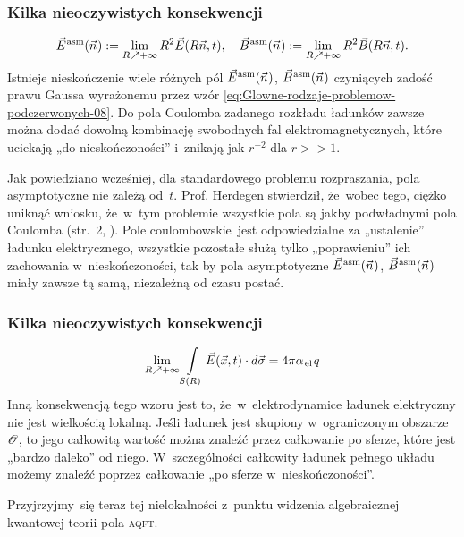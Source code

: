 \documentclass[10pt,t]{beamer}
\begin{document}
\begin{frame}
  \frametitle{Kilka nieoczywistych konsekwencji}

  \vspace{-1.5em}


  \begin{equation}
    \label{eq:Glowne-rodzaje-problemow-podczerwonych-10}
    \vec{E}^{ \hspace{0.05em} \text{asm} }( \vec{n} \hspace{0.05em} ) :=
    \lim_{ R \nearrow +\infty } R^{ 2 } \vec{E}( R \vec{n}, t ), \quad
    \vec{B}^{ \hspace{0.05em} \text{asm} }( \vec{n} \hspace{0.05em} ) :=
    \lim_{ R \nearrow +\infty } R^{ 2 } \vec{B}( R \vec{n}, t ).
  \end{equation}
  Istnieje nieskończenie wiele różnych pól $\vec{E}^{ \hspace{0.05em} \text{asm} }( \vec{n} \hspace{0.05em} )$, $\vec{B}^{ \hspace{0.05em} \text{asm} }( \vec{n} \hspace{0.05em} )$
  czyniących zadość prawu Gaussa wyrażonemu przez wzór
  \eqref{eq:Glowne-rodzaje-problemow-podczerwonych-08}. Do pola Coulomba
  zadanego rozkładu ładunków zawsze można dodać dowolną kombinację
  swobodnych fal elektromagnetycznych, które uciekają „do nieskończoności”
  i~znikają jak $r^{ -2 }$ dla $r >> 1$.

  Jak powiedziano wcześniej, dla standardowego problemu rozpraszania,
  pola asymptotyczne nie zależą od~$t$. Prof. Herdegen stwierdził,
  że~wobec tego, ciężko uniknąć wniosku, że~w~tym problemie wszystkie pola
  są jakby podwładnymi pola Coulomba (str.~2,
  \parencite{Herdegen-Infrared-structure-beyond-locality-ETC-Ver-2024}).
  Pole coulombowskie~jest odpowiedzialne za „ustalenie” ładunku
  elektrycznego, wszystkie pozostałe służą tylko „poprawieniu” ich
  zachowania w~nieskończoności, tak by pola asymptotyczne $\vec{E}^{ \hspace{0.05em} \text{asm} }( \vec{n} \hspace{0.05em} )$,
  $\vec{B}^{ \hspace{0.05em} \text{asm} }( \vec{n} \hspace{0.05em} )$ miały zawsze tą samą, niezależną od czasu postać.

\end{frame}





\begin{frame}
  \frametitle{Kilka nieoczywistych konsekwencji}


  \begin{equation}
    \label{eq:Glowne-rodzaje-problemow-podczerwonych-11}
    \lim_{ R \nearrow +\infty } \int\limits_{ S( R ) } \vec{E}( \vec{x}, t ) \cdot d\vec{ \sigma } =
    4 \pi \alpha_{ \hspace{0.09em} \text{el} } \hspace{0.09em} q
  \end{equation}
  Inną konsekwencją tego wzoru jest to, że~w~elektrodynamice ładunek
  elektryczny nie jest wielkością lokalną. Jeśli ładunek jest skupiony
  w~ograniczonym obszarze $\mathcal{O}$, to jego \alert{całkowitą} wartość można
  znaleźć przez całkowanie po sferze, które jest „bardzo daleko” od niego.
  W~szczególności całkowity ładunek pełnego układu możemy znaleźć poprzez
  całkowanie „po sferze w~nieskończoności”.

  Przyjrzyjmy~się teraz tej nielokalności z~punktu widzenia algebraicznej
  kwantowej teorii pola \textsc{aqft}.

\end{frame}
\end{document}
